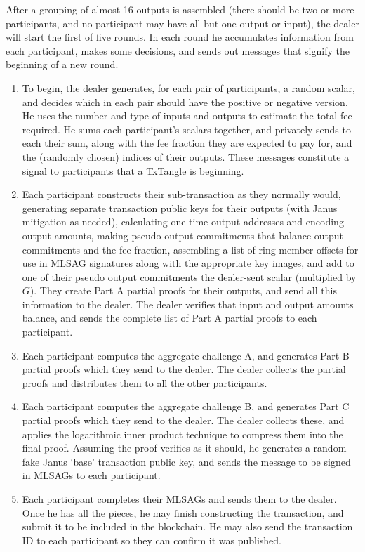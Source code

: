 After a grouping of almost 16 outputs is assembled (there should be two or more participants, and no participant may have all but one output or input), the dealer will start the first of five rounds. In each round he accumulates information from each participant, makes some decisions, and sends out messages that signify the beginning of a new round.
\begin{enumerate}
    \item To begin, the dealer generates, for each pair of participants, a random scalar, and decides which in each pair should have the positive or negative version. He uses the number and type of inputs and outputs to estimate the total fee required. He sums each participant's scalars together, and privately sends to each their sum, along with the fee fraction they are expected to pay for, and the (randomly chosen) indices of their outputs. These messages constitute a signal to participants that a TxTangle is beginning.
    \item Each participant constructs their sub-transaction as they normally would, generating separate transaction public keys for their outputs (with Janus mitigation as needed), calculating one-time output addresses and encoding output amounts, making pseudo output commitments that balance output commitments and the fee fraction, assembling a list of ring member offsets for use in MLSAG signatures along with the appropriate key images, and add to one of their pseudo output commitments the dealer-sent scalar (multiplied by $G$). They create Part A partial proofs for their outputs, and send all this information to the dealer. The dealer verifies that input and output amounts balance, and sends the complete list of Part A partial proofs to each participant.
    \item Each participant computes the aggregate challenge A, and generates Part B partial proofs which they send to the dealer. The dealer collects the partial proofs and distributes them to all the other participants.
    \item Each participant computes the aggregate challenge B, and generates Part C partial proofs which they send to the dealer. The dealer collects these, and applies the logarithmic inner product technique to compress them into the final proof. Assuming the proof verifies as it should, he generates a random fake Janus `base' transaction public key, and sends the message to be signed in MLSAGs to each participant.
    \item Each participant completes their MLSAGs and sends them to the dealer. Once he has all the pieces, he may finish constructing the transaction, and submit it to be included in the blockchain. He may also send the transaction ID to each participant so they can confirm it was published.
\end{enumerate}{}